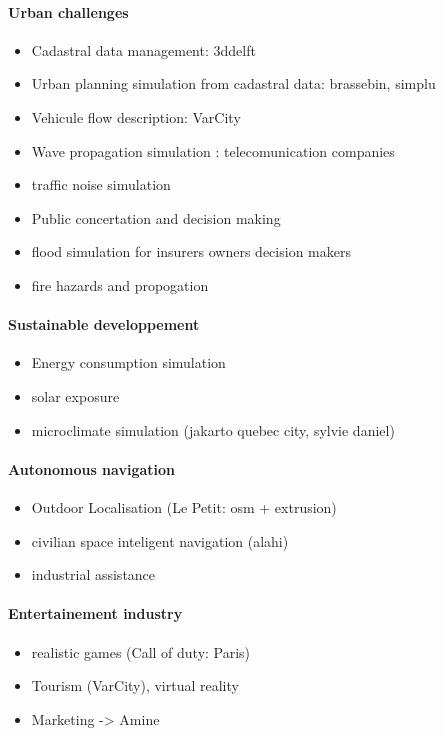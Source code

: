         \paragraph{Urban challenges}
        \begin{itemize}
            \item Cadastral data management: 3ddelft
            \item Urban planning simulation from cadastral data: brassebin, simplu
            \item Vehicule flow description: VarCity
            \item Wave propagation simulation : telecomunication companies
            \item traffic noise simulation
            \item Public concertation and decision making
            \item flood simulation for insurers owners decision makers
            \item fire hazards and propogation
        \end{itemize}
        \paragraph{Sustainable developpement}
        \begin{itemize}
            \item Energy consumption simulation
            \item solar exposure
            \item microclimate simulation (jakarto quebec city, sylvie daniel)
        \end{itemize}
        \paragraph{Autonomous navigation}
        \begin{itemize}
            \item Outdoor Localisation (Le Petit: osm + extrusion)
            \item civilian space inteligent navigation (alahi)
            \item industrial assistance
        \end{itemize}
        \paragraph{Entertainement industry}
        \begin{itemize}
            \item realistic games (Call of duty: Paris)
            \item Tourism (VarCity), virtual reality
            \item Marketing -> Amine
        \end{itemize}
